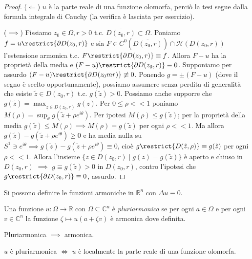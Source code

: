\begin{proof}
  ($\Leftarrow$) $u$ è la parte reale di una funzione olomorfa, perciò la tesi segue dalla formula integrale di Cauchy (la verifica è lasciata per esercizio).

  ($\implies$) Fissiamo $z_0 \in \Omega, r>0$ t.c. $\overline{D(z_0,r)} \subset \Omega$. Poniamo $f=u\restrict{\partial D(z_0,r)}$ e sia $F \in C^0(\overline{D(z_0,r)}) \cap \mathcal{H}(D(z_0,r))$ l'estensione armonica t.c. $F\restrict{\partial D(z_0,r)} \equiv f$. Allora $F-u$ ha la proprietà della media e $(F-u)\restrict{\partial D(z_0,r)} \equiv 0$.
  Supponiamo per assurdo $(F-u)\restrict{\partial D(z_0mr)} \not\equiv 0$. Ponendo $g=\pm(F-u)$ (dove il segno è scelto opportunamente), possiamo assumere senza perdita di generalità che esiste $\tilde{z} \in D(z_0,r)$ t.c. $g(\tilde{z})>0$. Possiamo anche supporre che $\displaystyle g(\tilde{z})=\max_{z \in \overline{D(z_0,r)}} g(z)$.
  Per $0 \le \rho <<1$ poniamo $\displaystyle M(\rho)=\sup_{\theta} g(\tilde{z}+\rho e^{i\theta})$. Per ipotesi $M(\rho) \le g(\tilde{z})$; per la proprietà della media $g(\tilde{z}) \le M(\rho) \implies M(\rho)=g(\tilde{z})$ per ogni $\rho<<1$.
  Ma allora $g(\tilde{z})-g(\tilde{z}+\rho e^{i\theta}) \ge 0$ e ha media nulla su $S^1 \ni e^{i\theta} \implies g(\tilde{z})-g(\tilde{z}+\rho e^{i\theta}) \equiv 0$, cioè $g\restrict{D(\tilde{z},\rho)} \equiv g(\tilde{z})$ per ogni $\rho <<1$.
  Allora l'insieme $\{z \in D(z_0,r) \mid g(z)=g(\tilde{z})\}$ è aperto e chiuso in $D(z_0,r)$ $\implies$ $g \equiv g(\tilde{z})>0$ in $D(z_0,r)$, contro l'ipotesi che $g\restrict{\partial D(z_0,r)} \equiv 0$, assurdo.
\end{proof}

\begin{oss}
  Si possono definire le funzioni armoniche in $\mathbb{R}^n$ con $\Delta u\equiv 0$.
\end{oss}

\begin{defn}
  Una funzione $u: \Omega \longrightarrow \mathbb{R}$ con $\Omega \subseteq \mathbb{C}^n$ è \textit{pluriarmonica} se per ogni $a \in \Omega$ e per ogni $v \in \mathbb{C}^n$ la funzione $\zeta \longmapsto u(a+\zeta v)$ è armonica dove definita.
\end{defn}

\begin{oss}
  Pluriarmonica $\implies$ armonica.
\end{oss}

\begin{ftt}
  $u$ è pluriarmonica $\iff$ $u$ è localmente la parte reale di una funzione olomorfa.
\end{ftt}
